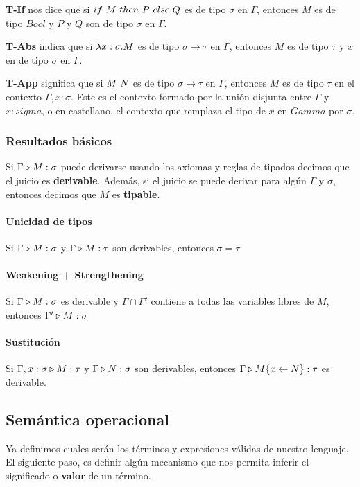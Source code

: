 \vspace*{5mm}
\textbf{T-If} nos dice que si $if~ M~ then~ P~ else~ Q$ es de tipo $\sigma$ en $\Gamma$, entonces $M$ es de tipo $Bool$ y $P$ y $Q$ son de tipo $\sigma$ en $\Gamma$.

\textbf{T-Abs} indica que si $\lambda x: \sigma . M$ es de tipo $\sigma\to\tau$ en $\Gamma$, entonces $M$ es de tipo $\tau$ y $x$ en de tipo $\sigma$ en $\Gamma$.

\textbf{T-App} significa que si $M~N$ es de tipo $\sigma\to\tau$ en $\Gamma$, entonces $M$ es de tipo $\tau$ en el contexto $\Gamma, x:\sigma$. Este es el contexto formado por la unión disjunta entre $\Gamma$ y $x:sigma$, o en castellano, el contexto que remplaza el tipo de $x$ en $Gamma$ por $\sigma$.

\subsubsection{Resultados básicos}

Si $\Gamma\triangleright M : \sigma$ puede derivarse usando los axiomas y reglas de tipados decimos que el juicio es \textbf{derivable}. Además, si el juicio se puede derivar para algún $\Gamma$ y $\sigma$, entonces decimos que $M$ es \textbf{tipable}.

\paragraph{Unicidad de tipos} Si $\Gamma\triangleright M : \sigma$ y $\Gamma\triangleright M : \tau$ son derivables, entonces $\sigma = \tau$

\paragraph{Weakening + Strengthening} Si $\Gamma\triangleright M : \sigma$ es derivable y $\Gamma\cap\Gamma'$ contiene a todas las variables libres de $M$, entonces $\Gamma'\triangleright M : \sigma$

\paragraph{Sustitución} Si $\Gamma,x:\sigma\triangleright M : \tau$ y $\Gamma\triangleright N : \sigma$ son derivables, entonces $\Gamma\triangleright M\{x\leftarrow N\} : \tau$ es derivable.

\subsection{Semántica operacional}
Ya definimos cuales serán los términos y expresiones válidas de nuestro lenguaje. El siguiente paso, es definir algún mecanismo que nos permita inferir el significado o \textbf{valor} de un término. 


